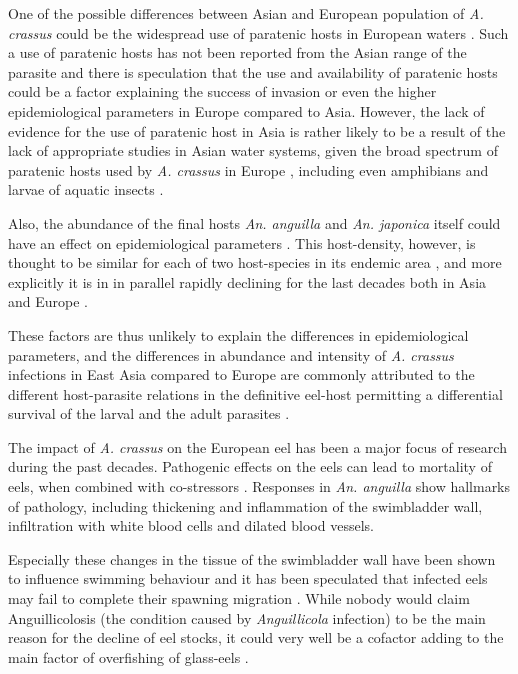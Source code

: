 One of the possible differences between Asian and European population
of \textit{A. crassus} could be the widespread use of paratenic hosts
in European waters \cite{thomas_paratenic_1992,
  pietrock_dynamics_2002}. Such a use of paratenic hosts has not been
reported from the Asian range of the parasite and there is speculation
that the use and availability of paratenic hosts could be a factor
explaining the success of invasion or even the higher epidemiological
parameters in Europe compared to Asia. However, the lack of evidence
for the use of paratenic host in Asia is rather likely to be a result
of the lack of appropriate studies in Asian water systems, given the
broad spectrum of paratenic hosts used by \textit{A. crassus} in
Europe
\cite{pietrock_dynamics_2002,rolbiecki_acndab_2004,szkely_dynamics_1995},
including even amphibians and larvae of aquatic insects
\cite{moravec_amphibians_1998}.

Also, the abundance of the final hosts \textit{An. anguilla} and
\textit{An. japonica} itself could have an effect on epidemiological
parameters \cite{schabuss_dynamics_2005}. This host-density, however,
is thought to be similar for each of two host-species in its endemic
area \cite{tesch1983aal}, and more explicitly it is in in parallel
rapidly declining for the last decades both in Asia and Europe
\cite{pmid12713741}.

These factors are thus unlikely to explain the differences in
epidemiological parameters, and the differences in abundance and
intensity of \textit{A. crassus} infections in East Asia compared to
Europe are commonly attributed to the different host-parasite
relations in the definitive eel-host permitting a differential
survival of the larval and the adult parasites
\cite{knopf_differences_2004, knopf_swimbladder_2006}.

The impact of \textit{A. crassus} on the European eel has been a major
focus of research during the past decades. Pathogenic effects on the
eels can lead to mortality of eels, when combined with co-stressors
\cite{gollock_physiological_2005}. Responses in \textit{An. anguilla}
show hallmarks of pathology, including thickening
\cite{wurtz_tara_2000} and inflammation
\cite{beregi_radiodiagnostic_1998} of the swimbladder wall,
infiltration with white blood cells and dilated blood vessels.

Especially these changes in the tissue of the swimbladder wall have
been shown to influence swimming behaviour and it has been speculated
that infected eels may fail to complete their spawning migration
\cite{palstra_swimming_2007}. While nobody would claim Anguillicolosis
(the condition caused by \textit{Anguillicola} infection) to be the
main reason for the decline of eel stocks, it could very well be a
cofactor \cite{sures_science_letter} adding to the main factor of
overfishing of glass-eels \cite{pmid12713741}.

